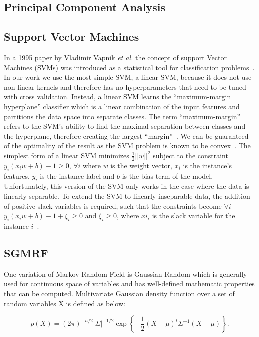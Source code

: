 \documentclass{article} %
\begin{document}
\subsection{Principal Component Analysis}

\subsection{Support Vector Machines}
In a 1995 paper by Vladimir Vapnik \emph{et al.} the concept of support 
Vector Machines (SVMs) was introduced  as a statistical tool for 
classification problems~\cite{shmilovici2005support}. In our work we
use the most simple SVM, a linear SVM, because it does not use non-linear
kernels and therefore has no hyperparameters that need to be tuned
with cross validation. Instead, a linear SVM learns the ``maximum-margin
hyperplane'' classifier which is a linear combination of the input 
features and partitions the data space into separate classes. The term 
``maximum-margin'' refers to the SVM's ability to find the maximal 
separation between classes and the hyperplane, therefore creating the 
largest ``margin''~\cite{shmilovici2005support}. We can be guaranteed of
the optimality of the result as the SVM problem is known to be 
convex~\cite{burges1998tutorial}. The simplest form of a linear SVM 
minimizes $\frac{1}{2}||w||^2$ subject to the constraint 
$y_i (x_i w + b) - 1 \ge 0 $, $\forall i$ where $w$ is the weight vector,
$x_i$ is the instance's features, $y_i$ is the instance label and $b$ is
the bias term of the model. Unfortunately, this version of the SVM only
works in the case where the data is linearly separable. To extend the SVM
to linearly inseparable data, the addition of positive slack variables is
required, such that the constraints become $\forall i$ 
$y_i (x_i w + b) - 1 + \xi_i \ge 0 $ and $\xi_i \ge 0$, where $xi_i$ is 
the slack variable for the instance $i$~\cite{burges1998tutorial}.


\subsection{SGMRF}
One variation of Markov Random Field is Gaussian Random which is generally 
used for continuous space of variables and has well-defined mathematic 
properties that can be computed. Multivariate Gaussian density function 
over a set of random variables X is defined as below: 

\begin{equation}\label{gaussian1}
p(X) = (2\pi)^{-n/2} |\Sigma|^{-1/2} \exp\left\{ -\frac{1}{2}(X - \mu)^t \Sigma^{-1} (X - \mu) \right\}.
\end{equation}
 
\end{document}
